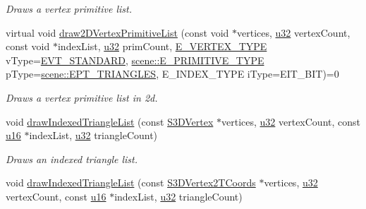 \begin{DoxyCompactItemize}
\begin{DoxyCompactList}\small\item\em Draws a vertex primitive list. \end{DoxyCompactList}\item 
virtual void \hyperlink{classirr_1_1video_1_1IVideoDriver_a34845920167c68578a78f842af54d140}{draw2\+D\+Vertex\+Primitive\+List} (const void $\ast$vertices, \hyperlink{namespaceirr_a0416a53257075833e7002efd0a18e804}{u32} vertex\+Count, const void $\ast$index\+List, \hyperlink{namespaceirr_a0416a53257075833e7002efd0a18e804}{u32} prim\+Count, \hyperlink{namespaceirr_1_1video_a0e3b59e025e0d0db0ed2ee0ce904deac}{E\+\_\+\+V\+E\+R\+T\+E\+X\+\_\+\+T\+Y\+PE} v\+Type=\hyperlink{namespaceirr_1_1video_a0e3b59e025e0d0db0ed2ee0ce904deaca921f287a4f48d612a5be2d89453ca262}{E\+V\+T\+\_\+\+S\+T\+A\+N\+D\+A\+RD}, \hyperlink{namespaceirr_1_1scene_a5d7de82f2169761194b2f44d95cdc1dc}{scene\+::\+E\+\_\+\+P\+R\+I\+M\+I\+T\+I\+V\+E\+\_\+\+T\+Y\+PE} p\+Type=\hyperlink{namespaceirr_1_1scene_a5d7de82f2169761194b2f44d95cdc1dca6c884c4de3210b3ed36c99fb828ce376}{scene\+::\+E\+P\+T\+\_\+\+T\+R\+I\+A\+N\+G\+L\+ES}, E\+\_\+\+I\+N\+D\+E\+X\+\_\+\+T\+Y\+PE i\+Type=E\+I\+T\+\_\+B\+IT)=0
\begin{DoxyCompactList}\small\item\em Draws a vertex primitive list in 2d. \end{DoxyCompactList}\item 
void \hyperlink{classirr_1_1video_1_1IVideoDriver_a55eba6140492faaed9dca7e16ad8dde2}{draw\+Indexed\+Triangle\+List} (const \hyperlink{structirr_1_1video_1_1S3DVertex}{S3\+D\+Vertex} $\ast$vertices, \hyperlink{namespaceirr_a0416a53257075833e7002efd0a18e804}{u32} vertex\+Count, const \hyperlink{namespaceirr_ae9f8ec82692ad3b83c21f555bfa70bcc}{u16} $\ast$index\+List, \hyperlink{namespaceirr_a0416a53257075833e7002efd0a18e804}{u32} triangle\+Count)
\begin{DoxyCompactList}\small\item\em Draws an indexed triangle list. \end{DoxyCompactList}\item 
void \hyperlink{classirr_1_1video_1_1IVideoDriver_a041d8028bc10f33c6707a3d1ddbdea4d}{draw\+Indexed\+Triangle\+List} (const \hyperlink{structirr_1_1video_1_1S3DVertex2TCoords}{S3\+D\+Vertex2\+T\+Coords} $\ast$vertices, \hyperlink{namespaceirr_a0416a53257075833e7002efd0a18e804}{u32} vertex\+Count, const \hyperlink{namespaceirr_ae9f8ec82692ad3b83c21f555bfa70bcc}{u16} $\ast$index\+List, \hyperlink{namespaceirr_a0416a53257075833e7002efd0a18e804}{u32} triangle\+Count)

\end{DoxyCompactItemize}
